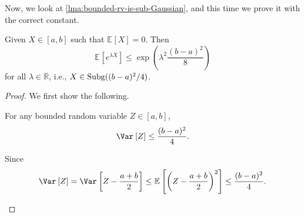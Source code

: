 Now, we look at \autoref{lma:bounded-rv-is-sub-Gaussian}, and this time we prove it with the correct constant.
\begin{lemma}\label{pf-lma:bounded-rv-is-sub-Gaussian}
	Given \(X\in [a, b]\) such that \(\mathbb{E}_{}\left[X \right] = 0\). Then
	\[
		\mathbb{E}_{}\left[e^{\lambda X} \right] \leq \exp (\lambda ^2 \frac{(b-a)^2}{8})
	\]
	for all \(\lambda \in \mathbb{R} \), i.e., \(X\in \operatorname{Subg}((b-a)^2 / 4) \).
\end{lemma}
\begin{proof}
	We first show the following.

	\begin{claim}\label{clm:variance-bound}
		For any bounded random variable \(Z\in [a, b]\),
		\[
			\Var_{}\left[Z \right] \leq \frac{(b-a)^2}{4}.
		\]
	\end{claim}
	\begin{explanation}
		Since
		\[
			\Var_{}\left[Z \right]
			= \Var_{}\left[Z - \frac{a+b}{2} \right]
			\leq \mathbb{E}_{}\left[\left( Z - \frac{a+b}{2} \right) ^2 \right]
			\leq \frac{(b-a)^2}{4}.
		\]
	\end{explanation}


\end{proof}
